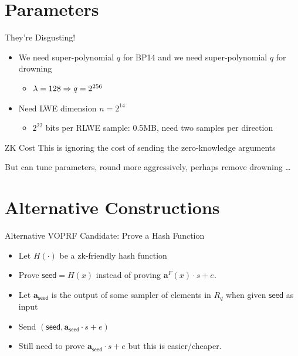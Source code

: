 \documentclass[xcolor=table,10pt,aspectratio=169]{beamer}
\begin{document}
\section{Parameters}
\label{sec:org4f51708}

\begin{frame}[label={sec:org771ccc5}]{They’re Disgusting!}
\begin{itemize}
\item We need super-polynomial \(q\) for BP14 and we need super-polynomial \(q\) for drowning
\begin{itemize}
\item \(\lambda = 128 \Rightarrow q = 2^{256}\)
\end{itemize}
\item Need   LWE dimension \(n = 2^{14}\)
\begin{itemize}
\item \(2^{22}\) bits per RLWE sample: 0.5MB, need two samples per direction
\end{itemize}
\end{itemize}

\begin{block}{ZK Cost}
This is ignoring the cost of sending the zero-knowledge arguments
\end{block}

But can tune parameters, round more aggressively, perhaps remove drowning …
\end{frame}

\section{Alternative Constructions}
\label{sec:org0493321}

\begin{frame}[label={sec:orgdf1767e}]{Alternative VOPRF Candidate: Prove a Hash Function}
\begin{itemize}
\item Let \(H(\cdot)\) be a zk-friendly hash function 
\item Prove \(\mathsf{seed} = H(x)\) instead of proving \(\mathbf{a}^F(x) \cdot s + e\).
\item Let \(\mathbf{a}_{\mathsf{seed}}\) is the output of some sampler  of elements in \(R_q\) when given  \(\mathsf{seed}\) as input
\item Send \((\mathsf{seed}, \mathbf{a}_{\mathsf{seed}} \cdot s + e)\)
\item Still need to prove \(\mathbf{a}_{\mathsf{seed}} \cdot s + e\) but this is easier/cheaper.
\end{itemize}
\end{frame}
\end{document}
